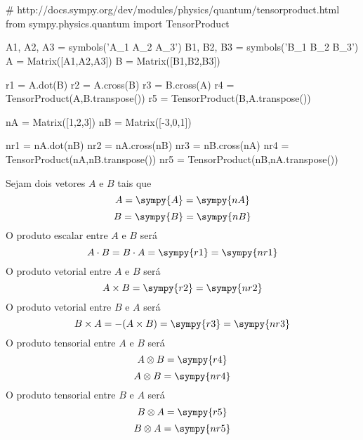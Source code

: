 \documentclass[a4paper,twocolumn,11pt]{article}
\begin{document}
\section{} %
\begin{sympycode}
# http://docs.sympy.org/dev/modules/physics/quantum/tensorproduct.html
from sympy.physics.quantum import TensorProduct

A1, A2, A3 = symbols('A_1 A_2 A_3')
B1, B2, B3 = symbols('B_1 B_2 B_3')
A = Matrix([A1,A2,A3])
B = Matrix([B1,B2,B3])

r1 = A.dot(B)
r2 = A.cross(B)
r3 = B.cross(A)
r4 = TensorProduct(A,B.transpose())
r5 = TensorProduct(B,A.transpose())

nA = Matrix([1,2,3])
nB = Matrix([-3,0,1])

nr1 = nA.dot(nB)
nr2 = nA.cross(nB)
nr3 = nB.cross(nA)
nr4 = TensorProduct(nA,nB.transpose())
nr5 = TensorProduct(nB,nA.transpose())
\end{sympycode}

Sejam dois vetores $A$ e $B$ tais que 
$$A = \sympy{A} = \sympy{nA}$$
$$B = \sympy{B} = \sympy{nB}$$
O produto escalar entre $A$ e $B$ será
$$A\cdot B = B\cdot A = \sympy{r1} = \sympy{nr1}$$
O produto vetorial entre $A$ e $B$ será
$$A\times B = \sympy{r2} = \sympy{nr2}$$
O produto vetorial entre $B$ e $A$ será
$$B\times A = -(A\times B) = \sympy{r3} = \sympy{nr3}$$
O produto tensorial entre $A$ e $B$ será
$$A\otimes B = \sympy{r4} $$
$$A\otimes B = \sympy{nr4}$$
O produto tensorial entre $B$ e $A$ será
$$B\otimes A = \sympy{r5}$$
$$B\otimes A = \sympy{nr5}$$
\end{document}
